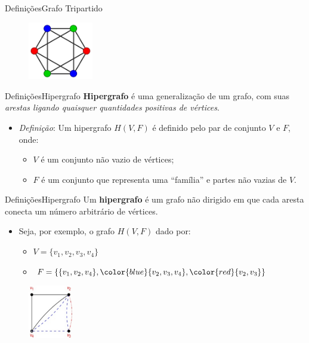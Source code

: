\documentclass[aspectratio=169]{beamer}
\begin{document}

\begin{frame}{Definições}{Grafo Tripartido}
\begin{figure}[!h]
  \centering
  \includegraphics[width=80pt]{imagens/exemplo_grafo_tripartido.png}
  \label{fig_exemplo_grafo_tripartido}
\end{figure}
\end{frame}


\begin{frame}{Definições}{Hipergrafo}
{\bf Hipergrafo} é uma generalização de um grafo, com suas {\it arestas ligando quaisquer quantidades positivas de vértices}.
\begin{itemize}
\item {\it Definição}: Um hipergrafo $H(V,F)$ é definido pelo par de conjunto $V$ e $F$, onde:
\begin{itemize}
\item $V$ é um conjunto não vazio de vértices;
\item $F$ é um conjunto que representa uma ``família'' e partes não vazias de $V$.	
\end{itemize}
\end{itemize}
\end{frame}


\begin{frame}{Definições}{Hipergrafo}
Um {\bf hipergrafo} é um grafo não dirigido em que cada aresta conecta um número arbitrário de vértices.
\begin{itemize}
\item Seja, por exemplo, o grafo $H(V,F)$ dado por:
\begin{itemize}
\item $V =\{v_1, v_2, v_3, v_4 \}$
\item $F = \{ \{v_1, v_2, v_4 \}, {\color{blue} \{v_2, v_3, v_4 \} },{\color{red} \{v_2, v_3 \} } \}$ 
\end{itemize}
\end{itemize}
\begin{figure}[!h]
  \centering
  \includegraphics[width=55pt]{imagens/exemplo_hipergrafo.png}
  \label{fig_exemplo_hipergrafo}
\end{figure}
\end{frame}
\end{document}
